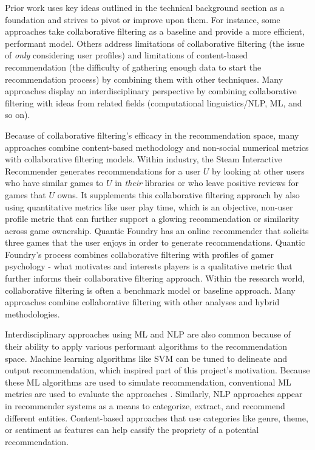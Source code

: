 \documentclass[10pt,twocolumn]{article}
\begin{document}
Prior work uses key ideas outlined in the technical background section as a foundation and strives to pivot or improve upon them. For instance, some approaches take collaborative filtering as a baseline and provide a more efficient, performant model. Others address limitations of collaborative filtering (the issue of \textit{only} considering user profiles) and limitations of content-based recommendation (the difficulty of gathering enough data to start the recommendation process) by combining them with other techniques. Many approaches display an interdisciplinary perspective by combining collaborative filtering with ideas from related fields (computational linguistics/NLP, ML, and so on).

Because of collaborative filtering's efficacy in the recommendation space, many approaches combine content-based methodology and non-social numerical metrics with collaborative filtering models. Within industry, the Steam Interactive Recommender \cite{SteamInteractiveRecommender} generates recommendations for a user $U$ by looking at other users who have similar games to $U$ in \textit{their} libraries or who leave positive reviews for games that $U$ owns. It supplements this collaborative filtering approach by also using quantitative metrics like user play time, which is an objective, non-user profile metric that can further support a glowing recommendation or similarity across game ownership. Quantic Foundry \cite{QuanticFoundryRecommender} has an online recommender that solicits three games that the user enjoys in order to generate recommendations. Quantic Foundry's process combines collaborative filtering with profiles of gamer psychology - what motivates and interests players is a qualitative metric that further informs their collaborative filtering approach. Within the research world, collaborative filtering is often a benchmark model or baseline approach. Many approaches combine collaborative filtering with other analyses and hybrid methodologies. \cite{Choi, Gohari, PerezMarcos}

Interdisciplinary approaches using ML and NLP are also common because of their ability to apply various performant algorithms to the recommendation space. Machine learning algorithms like SVM can be tuned to delineate and output recommendation, which inspired part of this project's motivation. \cite{XuAraki} Because these ML algorithms are used to simulate recommendation, conventional ML metrics are used to evaluate the approaches \cite{Nawrocka, Chowdhury, Sujatha}. Similarly, NLP approaches appear in recommender systems as a means to categorize, extract, and recommend different entities. Content-based approaches that use categories like genre, theme, or sentiment as features can help cassify the propriety of a potential recommendation. \cite{Berbatova, Asani}
\end{document}
